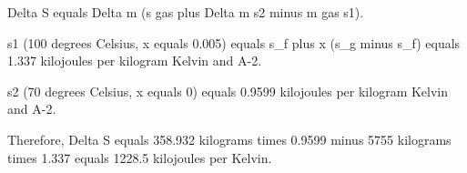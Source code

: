 Delta S equals Delta m (s gas plus Delta m s2 minus m gas s1).

s1 (100 degrees Celsius, x equals 0.005) equals s_f plus x (s_g minus s_f) equals 1.337 kilojoules per kilogram Kelvin and A-2.

s2 (70 degrees Celsius, x equals 0) equals 0.9599 kilojoules per kilogram Kelvin and A-2.

Therefore, Delta S equals 358.932 kilograms times 0.9599 minus 5755 kilograms times 1.337 equals 1228.5 kilojoules per Kelvin.
